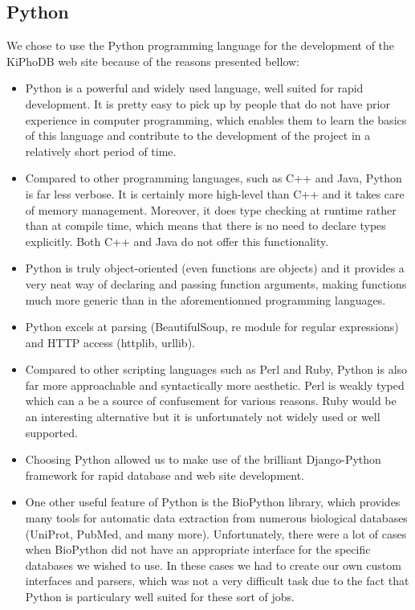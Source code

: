 \subsection{Python}
We chose to use the Python programming language for the development of the KiPhoDB web site because of the reasons presented bellow:
\begin{itemize}
\item Python is a powerful and widely used language, well suited for rapid development. It is pretty easy to pick up by people that do not have prior experience in computer programming, which enables them to learn the basics of this language and contribute to the development of the project in a relatively short period of time.

\item Compared to other programming languages, such as C++ and Java, Python is far less verbose. It is certainly more high-level than C++ and it takes care of memory management. Moreover, it does type checking at runtime rather than at compile time, which means that there is no need to declare types explicitly. Both C++ and Java do not offer this functionality.

\item Python is truly object-oriented (even functions are objects) and it provides a very neat way of declaring and passing function arguments, making functions much more generic than in the aforementionned programming languages.

\item Python excels at parsing (BeautifulSoup, re module for regular expressions) and HTTP access (httplib, urllib).

\item Compared to other scripting languages such as Perl and Ruby, Python is also far more approachable and syntactically more aesthetic. Perl is weakly typed which can a be a source of confusement for various reasons. Ruby would be an interesting alternative but it is unfortunately not widely used or well supported.

\item Choosing Python  allowed us to make use of the brilliant Django-Python framework for rapid database and web site development.

\item One other useful feature of Python is the BioPython library, which provides many tools for automatic data extraction from numerous biological databases (UniProt, PubMed, and many more). Unfortunately, there were a lot of cases when BioPython did not have an appropriate interface for the specific databases we wished to use. In these cases we had to create our own custom interfaces and parsers, which was not a very difficult task due to the fact that Python is particulary well suited for these sort of jobs.
\end{itemize}

